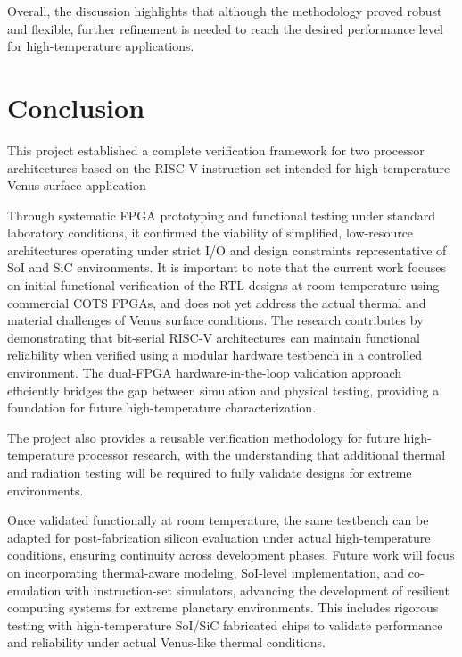 \documentclass[10pt,twocolumn]{article}
\begin{document}
Overall, the discussion highlights that although the methodology proved robust and flexible, further refinement is needed to reach the desired performance level for high-temperature applications.


\section{Conclusion}
This project established a complete verification framework for two processor architectures based on the RISC-V instruction set intended for high-temperature Venus surface application

Through systematic FPGA prototyping and functional testing under standard laboratory conditions, it confirmed the viability of simplified, low-resource architectures operating under strict I/O and design constraints representative of SoI and SiC environments. It is important to note that the current work focuses on initial functional verification of the RTL designs at room temperature using commercial COTS FPGAs, and does not yet address the actual thermal and material challenges of Venus surface conditions.
The research contributes by demonstrating that bit-serial RISC-V architectures can maintain functional reliability when verified using a modular hardware testbench in a controlled environment. The dual-FPGA hardware-in-the-loop validation approach efficiently bridges the gap between simulation and physical testing, providing a foundation for future high-temperature characterization.

The project also provides a reusable verification methodology for future high-temperature processor research, with the understanding that additional thermal and radiation testing will be required to fully validate designs for extreme environments.

Once validated functionally at room temperature, the same testbench can be adapted for post-fabrication silicon evaluation under actual high-temperature conditions, ensuring continuity across development phases.
Future work will focus on incorporating thermal-aware modeling, SoI-level implementation, and co-emulation with instruction-set simulators, advancing the development of resilient computing systems for extreme planetary environments. This includes rigorous testing with high-temperature SoI/SiC fabricated chips to validate performance and reliability under actual Venus-like thermal conditions.



\end{document}
